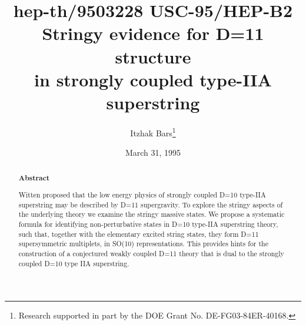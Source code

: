 



\author{Itzhak Bars\thanks{%
Research supported in part by the DOE Grant No. DE-FG03-84ER-40168. }\medskip}
\address{Department of Physics and Astronomy\\
University of Southern California\\
Los Angeles, CA 90089-0484}
\title{{\small \noindent hep-th/9503228 \hfill USC-95/HEP-B2 } \bigskip\\
Stringy evidence for D=11 structure \\
in strongly coupled type-IIA superstring}
\date{March 31, 1995}
\maketitle

\begin{abstract}
\centerline{\bf Abstract}\smallskip

Witten proposed that the low energy physics of strongly coupled D=10
type-IIA superstring may be described by D=11 supergravity. To explore the
stringy aspects of the underlying theory we examine the stringy massive
states. We propose a systematic formula for identifying non-perturbative
states in D=10 type-IIA superstring theory, such that, together with the
elementary excited string states, they form D=11 supersymmetric multiplets,
in SO(10) representations. This provides hints for the construction of a
conjectured weakly coupled D=11 theory that is dual to the strongly coupled
D=10 type IIA superstring.
\end{abstract}

